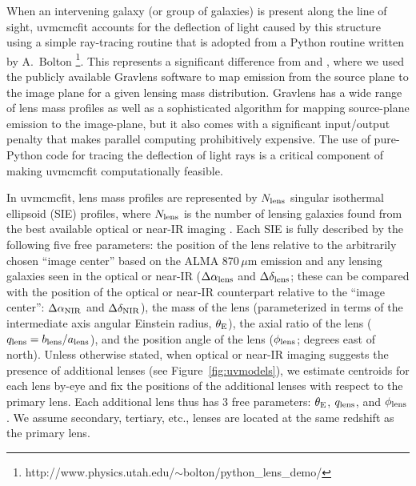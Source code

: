 \documentclass[iop]{emulateapj}
\begin{document}
When an intervening galaxy (or group of galaxies) is present along the line of
sight, {\sc uvmcmcfit} accounts for the deflection of light caused by this
structure using a simple ray-tracing routine that is adopted from a 
Python routine written by A.~Bolton
\footnote{http://www.physics.utah.edu/$\sim$bolton/python\_lens\_demo/}.  This
represents a significant difference from \citet{Bussmann:2012lr} and
\citet{Bussmann:2013lr}, where we used the publicly available {\sc Gravlens}
software \citep{Keeton:2001lr} to map emission from the source plane to
the image plane for a given lensing mass distribution.  {\sc Gravlens} has a
wide range of lens mass profiles as well as a sophisticated algorithm for
mapping source-plane emission to the image-plane, but it also comes with a
significant input/output penalty that makes parallel computing prohibitively
expensive.  The use of pure-Python code for tracing the deflection of light
rays is a critical component of making {\sc uvmcmcfit} computationally
feasible.

In {\sc uvmcmcfit}, lens mass profiles are represented by $N_{\rm lens}$
singular isothermal ellipsoid (SIE) profiles, where $N_{\rm lens}$ is the
number of lensing galaxies found from the best available optical or near-IR
imaging \citep[a multitude of evidence supports the SIE as a reasonable choice;
for a recent review, see][]{Treu:2010fk}.  Each SIE is fully described by the
following five free parameters: the position of the lens relative to the
arbitrarily chosen ``image center'' based on the ALMA 870$\,\mu$m emission and
any lensing galaxies seen in the optical or near-IR ($\Delta \alpha_{\rm lens}$
and $\Delta \delta_{\rm lens}$; these can be compared with the position of the
optical or near-IR counterpart relative to the ``image center'': $\Delta
\alpha_{\rm NIR}$ and $\Delta \delta_{\rm NIR}$), the mass of the lens
(parameterized in terms of the intermediate axis angular Einstein radius,
$\theta_{\rm E}$), the axial ratio of the lens ($q_{\rm lens} = b_{\rm lens} /
a_{\rm lens}$), and the position angle of the lens ($\phi_{\rm lens}$; degrees
east of north).  Unless otherwise stated, when optical or near-IR imaging
suggests the presence of additional lenses (see Figure~\ref{fig:uvmodels}), we
estimate centroids for each lens by-eye and fix the positions of the additional
lenses with respect to the primary lens.  Each additional lens thus has 3 free
parameters: $\theta_{\rm E}$, $q_{\rm lens}$, and $\phi_{\rm lens}$.  We assume
secondary, tertiary, etc., lenses are located at the same redshift as the
primary lens.  
\end{document}

